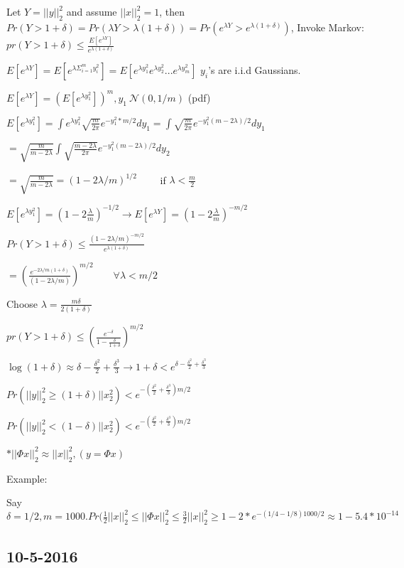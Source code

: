 \documentclass[12pt,letterpaper]{report}
\begin{document}
Let $Y = ||y||_2^2$ and assume $||x||_2^2 = 1$, then  $Pr(Y > 1 + \delta) = Pr(\lambda Y > \lambda(1+\delta)) = Pr(e^{\lambda Y} > e^{\lambda(1 + \delta)})$, Invoke Markov: $pr(Y > 1 + \delta) \leq \frac{E[e^{\lambda Y}]}{e^{\lambda(1+\delta)}}$

$E[e^{\lambda Y}] = E[e^{\lambda \Sigma_{i=1}^m y_i^2}] = E[e^{\lambda y_1^2}e^{\lambda y_2^2}...e^{\lambda y_m^2}]$ $y_i$'s are i.i.d Gaussians.

$E[e^{\lambda Y}] = (E[e^{\lambda y_1^2}])^m, y_1 ~ \mathcal{N}(0, 1/m)$ (pdf)

$E[e^{\lambda y_1^2}] = \int e^{\lambda y_1^2} \sqrt{\frac{m}{2 \pi}} e^{-y_1^2*m/2} dy_1 = \int \sqrt{\frac{m}{2 \pi}} e^{-y_1^2(m-2\lambda)/2} dy_1$

$=\sqrt{\frac{m}{m - 2\lambda}} \int \sqrt{\frac{m - 2\lambda}{2 \pi}} e^{-y_1^2(m-2\lambda)/2} dy_2$

$=\sqrt{\frac{m}{m - 2\lambda}} = (1 - 2 \lambda/m)^{1/2} \qquad$ if $\lambda < \frac{m}{2}$

$ E[e^{\lambda y_1^2}] = (1 - 2 \frac{\lambda}{m})^{-1/2} \rightarrow E[e^{\lambda Y}] = (1 - 2 \frac{\lambda}{m})^{-m/2}$

$Pr(Y > 1 + \delta) \leq \frac{(1 - 2 \lambda / m)^{-m/2}}{e^{\lambda(1+\delta)}}$

$=(\frac{e^{-2 \lambda / m(1+\delta)}}{(1 - 2 \lambda / m)})^{m/2} \qquad \forall \lambda < m/2$


Choose $\lambda = \frac{m \delta}{2(1 + \delta)}$

$pr(Y > 1 + \delta) \leq (\frac{e^{-\delta}}{1 - \frac{\delta}{1+\delta}})^{m/2}$

$\log(1 + \delta) \approx \delta - \frac{\delta^2}{2} + \frac{\delta^3}{3} \rightarrow 1 + \delta < e^{\delta - \frac{\delta^2}{2} + \frac{\delta^3}{3}}$


$Pr(||y||_2^2 \geq (1 + \delta) ||x_2^2) < e^{-(\frac{\delta^2}{2} + \frac{\delta^3}{3})m/2}$

$Pr(||y||_2^2 < (1 - \delta) ||x_2^2) < e^{-(\frac{\delta^2}{2} + \frac{\delta^3}{3})m/2}$

$* ||\Phi x||_2^2 \approx ||x||_2^2, (y = \Phi x)$

Example:

Say $\delta = 1/2, m = 1000. Pr(\frac{1}{2}||x||_2^2 \leq ||\Phi x||_2^2 \leq \frac{3}{2}||x||_2^2 \geq 1 - 2*e^{-(1/4 -1/8)1000/2} \approx 1 - 5.4 * 10^{-14}$



\subsection*{10-5-2016}
\end{document}
